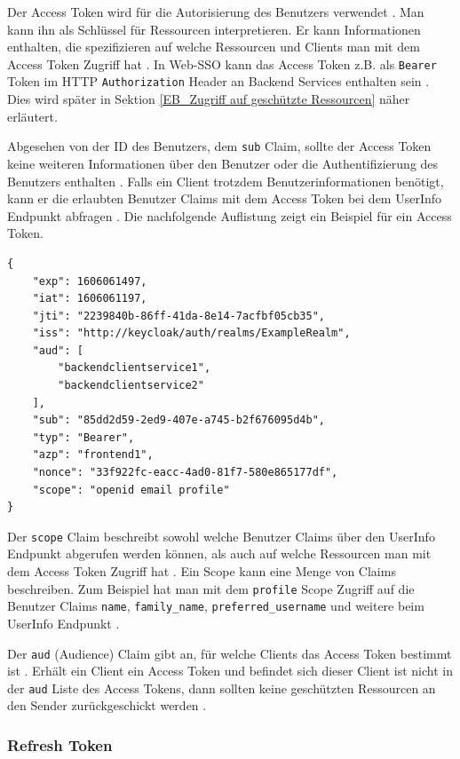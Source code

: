 Der Access Token wird für die Autorisierung des Benutzers verwendet \cite{RFC6749}. Man kann ihn als Schlüssel für Ressourcen interpretieren. Er kann Informationen enthalten, die spezifizieren auf welche Ressourcen und Clients man mit dem Access Token Zugriff hat \cite[Audience Support]{keycloakDocs}. In Web-SSO kann das Access Token z.B. als \texttt{Bearer} Token im HTTP \texttt{Authorization} Header an Backend Services enthalten sein \cite{RFC6750}. Dies wird später in Sektion \ref{EB_Zugriff auf geschützte Ressourcen} näher erläutert.

Abgesehen von der ID des Benutzers, dem \texttt{sub} Claim, sollte der Access Token keine weiteren Informationen über den Benutzer oder die Authentifizierung des Benutzers enthalten \cite{EB7}. Falls ein Client trotzdem Benutzerinformationen benötigt, kann er die erlaubten Benutzer Claims mit dem Access Token bei dem UserInfo Endpunkt abfragen \cite[UserInfo Endpoint]{EB4}. Die nachfolgende Auflistung zeigt ein Beispiel für ein Access Token.

\begin{lstlisting}[caption=Beispiel Access Token, captionpos=b]
{
	"exp": 1606061497,
	"iat": 1606061197,
	"jti": "2239840b-86ff-41da-8e14-7acfbf05cb35",
	"iss": "http://keycloak/auth/realms/ExampleRealm",
	"aud": [
		"backendclientservice1",
		"backendclientservice2"
	],
	"sub": "85dd2d59-2ed9-407e-a745-b2f676095d4b",
	"typ": "Bearer",
	"azp": "frontend1",
	"nonce": "33f922fc-eacc-4ad0-81f7-580e865177df",
	"scope": "openid email profile"
}
\end{lstlisting}

Der \texttt{scope} Claim beschreibt sowohl welche Benutzer Claims über den UserInfo Endpunkt abgerufen werden können, als auch auf welche Ressourcen man mit dem Access Token Zugriff hat \cite[Requesting Claims]{EB4} \cite{EB7}. Ein Scope kann eine Menge von Claims beschreiben. Zum Beispiel hat man mit dem \texttt{profile} Scope Zugriff auf die Benutzer Claims \texttt{name}, \texttt{family\_name}, \texttt{preferred\_username} und weitere beim UserInfo Endpunkt \cite[Requesting Claims]{EB4}. 

Der \texttt{aud} (Audience) Claim gibt an, für welche Clients das Access Token bestimmt ist \cite[ID Token]{EB4}. Erhält ein Client ein Access Token und befindet sich dieser Client ist nicht in der \texttt{aud} Liste des Access Tokens, dann sollten keine geschützten Ressourcen an den Sender zurückgeschickt werden \cite{EB59}.

\subsubsection{Refresh Token}

